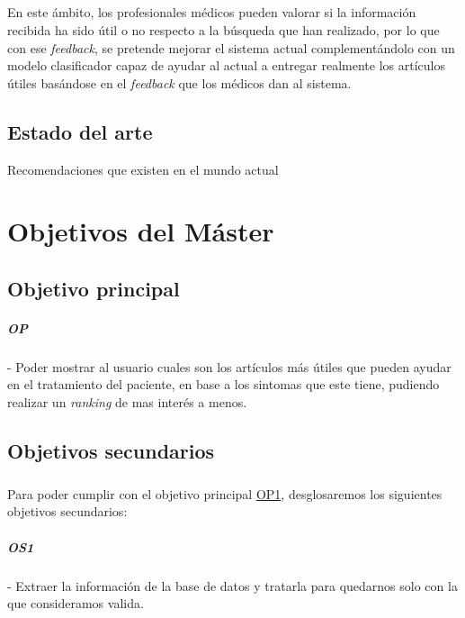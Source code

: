 \documentclass[10pt,a4paper,oneside]{book}
\begin{document}
\paragraph{}
En este ámbito, los profesionales médicos pueden valorar si la información recibida ha sido útil o no respecto a la búsqueda que han realizado, por lo que con ese \textit{feedback}, se pretende mejorar el sistema actual complementándolo con un modelo clasificador capaz de ayudar al actual a entregar realmente los artículos útiles basándose en el \textit{feedback} que los médicos dan al sistema.


\section{Estado del arte}
Recomendaciones que existen en el mundo actual


\chapter{Objetivos del Máster}

\section{Objetivo principal}

\label{op:OP1}
\paragraph{OP} - Poder mostrar al usuario cuales son los artículos más útiles que pueden ayudar en el tratamiento del paciente, en base a los sintomas que este tiene, pudiendo realizar un \textit{ranking} de mas interés a menos.

\section{Objetivos secundarios}

\paragraph{}
Para poder cumplir con el objetivo principal \hyperref[op:OP1]{OP1}, desglosaremos los siguientes objetivos secundarios:

\label{os:OS1}
\paragraph{OS1} - Extraer la información de la base de datos y tratarla para quedarnos solo con la que consideramos valida.
\end{document}
